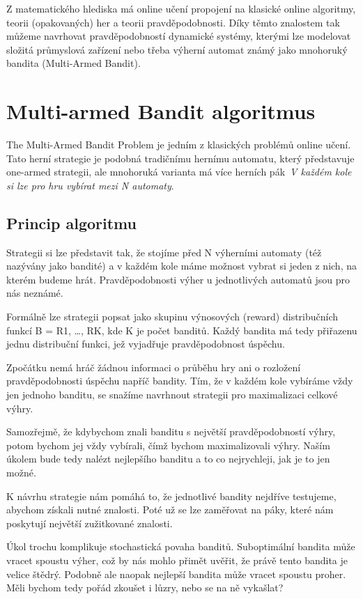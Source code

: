 \documentclass[thesis=M,czech]{FITthesis}[2014/05/07]
\begin{document}
Z matematického hlediska má online učení propojení na klasické online algoritmy, teorii (opakovaných) her a teorii pravděpodobnosti. Díky těmto znalostem tak můžeme navrhovat pravděpodobností dynamické systémy, kterými lze modelovat složitá průmyslová zařízení nebo třeba výherní automat známý jako mnohoruký bandita (Multi-Armed Bandit).

\section{Multi-armed Bandit algoritmus}
The Multi-Armed Bandit Problem je jedním z klasických problémů online učení. Tato herní strategie je podobná tradičnímu hernímu automatu, který představuje one-armed strategii, ale mnohoruká varianta má více herních pák~\emph{V každém kole si lze pro hru vybírat mezi N automaty}. 

\subsection{Princip algoritmu}
Strategii si lze představit tak, že stojíme před N výherními automaty (též nazývány jako bandité) a v každém kole máme možnost vybrat si jeden z nich, na kterém budeme hrát. Pravděpodobnosti výher u jednotlivých automatů jsou pro nás neznámé. 

Formálně lze strategii popsat jako skupinu výnosových (reward) distribučních funkcí B = {R1, …, RK}, kde K je počet banditů. Každý bandita má tedy přiřazenu jednu distribuční funkci, jež vyjadřuje pravděpodobnost úspěchu. 

Zpočátku nemá hráč žádnou informaci o průběhu hry ani o rozložení pravděpodobnosti úspěchu napříč bandity. Tím, že v každém kole vybíráme vždy jen jednoho banditu, se snažíme navrhnout strategii pro maximalizaci celkové výhry.

Samozřejmě, že kdybychom znali banditu s největší pravděpodobností výhry, potom bychom jej vždy vybírali, čímž bychom maximalizovali výhry. Naším úkolem bude tedy nalézt nejlepšího banditu a to co nejrychleji, jak je to jen možné.

K návrhu strategie nám pomáhá to, že jednotlivé bandity nejdříve testujeme, abychom získali nutné znalosti. Poté už se lze zaměřovat na páky, které nám poskytují největší zužitkované znalosti. 

Úkol trochu komplikuje stochastická povaha banditů. Suboptimální bandita může vracet spoustu výher, což by nás mohlo přimět uvěřit, že právě tento bandita je velice štědrý. Podobně ale naopak nejlepší bandita může vracet spoustu proher. Měli bychom tedy pořád zkoušet i lůzry, nebo se na ně vykašlat?
\end{document}
